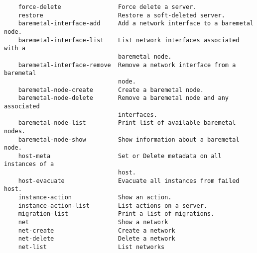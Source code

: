 \documentclass[a4paper,left=1.5cm,right=1.5cm,11pt]{article}
\begin{document}
\begin{lstlisting}
    force-delete                Force delete a server.
    restore                     Restore a soft-deleted server.
    baremetal-interface-add     Add a network interface to a baremetal node.
    baremetal-interface-list    List network interfaces associated with a
                                baremetal node.
    baremetal-interface-remove  Remove a network interface from a baremetal
                                node.
    baremetal-node-create       Create a baremetal node.
    baremetal-node-delete       Remove a baremetal node and any associated
                                interfaces.
    baremetal-node-list         Print list of available baremetal nodes.
    baremetal-node-show         Show information about a baremetal node.
    host-meta                   Set or Delete metadata on all instances of a
                                host.
    host-evacuate               Evacuate all instances from failed host.
    instance-action             Show an action.
    instance-action-list        List actions on a server.
    migration-list              Print a list of migrations.
    net                         Show a network
    net-create                  Create a network
    net-delete                  Delete a network
    net-list                    List networks


\end{lstlisting}
\end{document}
